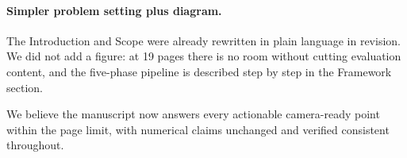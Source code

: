 \documentclass[11pt,a4paper]{article}
\begin{document}
\paragraph{Simpler problem setting plus diagram.} The Introduction and Scope were already rewritten in plain language in revision. We did not add a figure: at 19 pages there is no room without cutting evaluation content, and the five-phase pipeline is described step by step in the Framework section.

We believe the manuscript now answers every actionable camera-ready point within the page limit, with numerical claims unchanged and verified consistent throughout.
\end{document}
